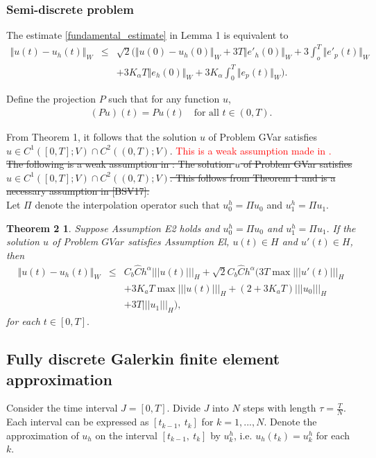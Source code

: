 \documentclass[../../main.tex]{subfiles}
\begin{document}
\subsubsection{Semi-discrete problem}
The estimate \eqref{fundamental_estimate} in Lemma 1 is equivalent to
\begin{eqnarray*}
	\Vert u(t) - u_h(t) \Vert_{W} &\leq& \sqrt{2} \biggl( \Vert u(0) - u_h(0) \Vert_W + 3T\Vert e'_h(0) \Vert_W + 3 \int_o^T \Vert e'_p(t)\Vert_W\nonumber \\
	&& + 3K_\alpha T \Vert e_h(0) \Vert_W + 3K_\alpha \int_0^T \Vert e_p(t) \Vert_W \biggr).
\end{eqnarray*}


Define the projection $P$ such that for any function $u$,
\begin{eqnarray*}
	(Pu)(t) = Pu(t) \ \ \ \textrm{ for all } t \in (0,T).
\end{eqnarray*}



From Theorem 1, it follows that the solution $u$ of Problem GVar satisfies $u \in C^1([0,T]; V) \cap C^2((0,T);V)$. \textcolor{red}{This is a weak assumption made in \cite{BV13}.}\\

\sout{The following is a weak assumption in \cite{BV13}: The solution $u$ of Problem GVar satisfies $u \in C^1([0,T]; V) \cap C^2((0,T);V)$. This follows from Theorem 1 and is a necessary assumption in [BSV17].}\\

Let $\Pi$ denote the interpolation operator such that $u_0^h = \Pi u_0$ and $u_1^h = \Pi u_1$.

\newtheorem*{DC_Thm4}{Theorem 2}
\begin{DC_Thm4}
	Suppose Assumption E2 holds and $u_{0}^{h}=\Pi u_{0}$ and $u_{1}^{h}=\Pi u_{1}.$ If the solution $u$ of Problem $GVar$ satisfies Assumption El, $u(t)\in H$ and $u'(t)\in H$, then
	\begin{eqnarray*}
		\Vert u(t)-u_{h}(t)\Vert_{W} & \leq & C_{b} \hat{C}h^{\alpha}|||u(t)|||_{H}+\sqrt{2}C_{b}\hat{C}h^{\alpha}(3T\max|||u'(t)|||_{H}\\
		& & +3K_{a}T\max|||u(t)|||_{H}+(2+3K_{a}T)|||u_{0}|||_{H} \\
		& & +3T|||u_{1}|||_{H}) ,
	\end{eqnarray*} for each $t\in[0, T].$
\end{DC_Thm4}


\subsection{Fully discrete Galerkin finite element approximation}
Consider the time interval $J = [0,T]$. Divide $J$ into $N$ steps with length $\tau = \frac{T}{N}$. Each interval can be expressed as $[t_{k-1}, \ t_k]$ for $k = 1,...,N$. Denote the approximation of $u_h$ on the interval $[t_{k-1}, \ t_k]$ by $u_k^h$, i.e. $u_h(t_k) = u_k^h$ for each $k$.\\
\end{document}
